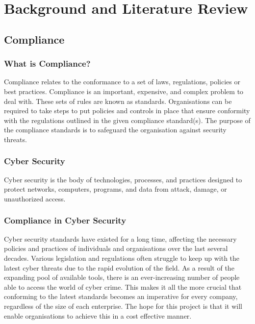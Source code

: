 \chapter{Background and Literature Review} \label{Chapter:two}


\section{Compliance}

    \subsection{What is Compliance?}
        Compliance relates to the conformance to a set of laws, regulations, policies or best practices. Compliance is an important, expensive, and complex problem to deal with. \cite{ComplianceGovernance} These sets of rules are known as standards. Organisations can be required to take steps to put policies and controls in place that ensure conformity with the regulations outlined in the given compliance standard(s). The purpose of the compliance standards is to safeguard the organisation against security threats.

    \subsection{Cyber Security}
        Cyber security is the body of technologies, processes, and practices designed to protect networks, computers, programs, and data from attack, damage, or unauthorized access. \cite{CSCRM}

    \subsection{Compliance in Cyber Security}
        Cyber security standards have existed for a long time, affecting the necessary policies and practices of individuals and organisations over the last several decades. \cite{StanfordConsortium} Various legislation and regulations often struggle to keep up with the latest cyber threats due to the rapid evolution of the field. \cite{GDPR} As a result of the expanding pool of available tools, there is an ever-increasing number of people able to access the world of cyber crime. This makes it all the more crucial that conforming to the latest standards becomes an imperative for every company, regardless of the size of each enterprise. The hope for this project is that it will enable organisations to achieve this in a cost effective manner.


